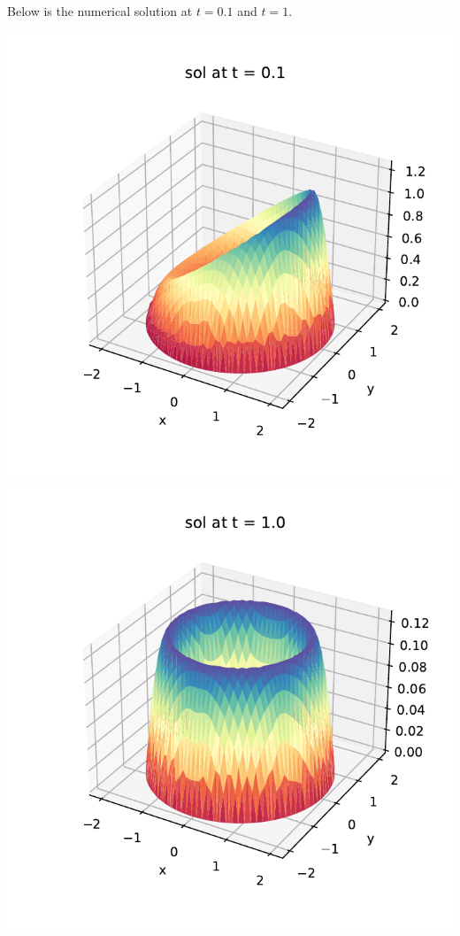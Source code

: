 \documentclass{article}
\begin{document}
\begin{enumerate}
\begin{enumerate}
	Below is the numerical solution at $t=0.1$ and $t=1$.
	
	\begin{center}
		\includegraphics[scale=.6]{hw10 sol t=0.1}
		\includegraphics[scale=.6]{hw10 sol t=1.0}
	\end{center}
	

\end{enumerate}
\end{enumerate}
\end{document}
